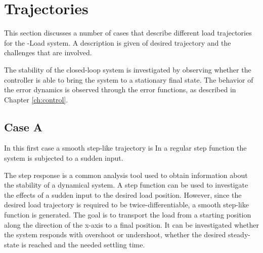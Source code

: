 



\newpage
\section{Trajectories}\label{sec:set.traj}


This section discusses a number of cases that describe different load trajectories for the -Load system.
A description is given of desired trajectory and the challenges that are involved.

The stability of the closed-loop system is investigated by observing whether the controller is able to bring the system to a stationary final state.
The behavior of the error dynamics is observed through the error functions, as described in Chapter \ref{ch:control}.

\subsection*{Case A}
In this first case a smooth step-like trajectory is 
In a regular step function the system is subjected to a sudden input.


The step response is a common analysis tool used to obtain information about the stability of a dynamical system.
A step function can be used to investigate the effects of a sudden input to the desired load position.
However, since the desired load trajectory is required to be twice-differentiable, a smooth step-like function is generated.
The goal is to transport the load from a starting position along the direction of the x-axis to a final position. 
It can be investigated whether the system responds with overshoot or undershoot, whether the desired steady-state is reached and the needed settling time.

